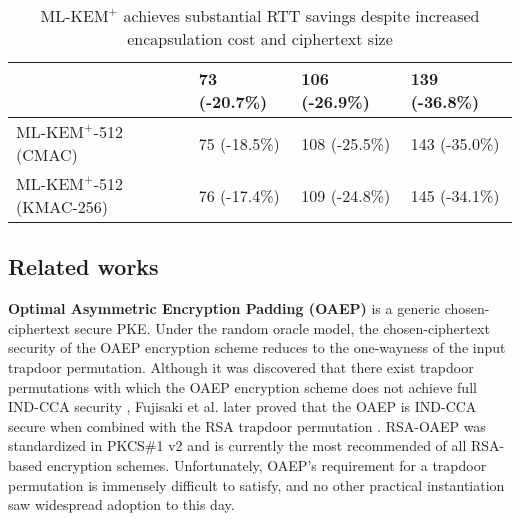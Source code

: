 \documentclass[journal=tches,submission]{iacrtrans}
\def\mlkemplus{\text{ML-KEM}^+}
\begin{document}
\begin{table}[h]
\begin{tabular}{|p{2.5cm}|p{1.4cm}|p{1.8cm}|p{1.8cm}|}
       & 73 \newline (-20.7\%)
       & 106 \newline (-26.9\%)
       & 139 \newline (-36.8\%) \\
       \hline
       $\mlkemplus$-512 \newline (CMAC)
       & 75 \newline (-18.5\%)
       & 108 \newline (-25.5\%)
       & 143 \newline (-35.0\%) \\
       \hline
       $\mlkemplus$-512 \newline (KMAC-256)
       & 76 \newline (-17.4\%)
       & 109 \newline (-24.8\%)
       & 145 \newline (-34.1\%) \\
       \hline
    \end{tabular}

    \caption{$\mlkemplus$ achieves substantial RTT savings despite increased encapsulation cost and ciphertext size}\label{tbl:rtt-summary}
\end{table}

\subsection{Related works}
\textbf{Optimal Asymmetric Encryption Padding (OAEP)} \cite{DBLP:conf/eurocrypt/BellareR94}\cite{DBLP:conf/crypto/BellareDPR98} is a generic chosen-ciphertext secure PKE. Under the random oracle model, the chosen-ciphertext security of the OAEP encryption scheme reduces to the one-wayness of the input trapdoor permutation. Although it was discovered that there exist trapdoor permutations with which the OAEP encryption scheme does not achieve full IND-CCA security \cite{DBLP:journals/joc/Shoup02}, Fujisaki et al. later proved that the OAEP is IND-CCA secure when combined with the RSA trapdoor permutation \cite{DBLP:conf/crypto/FujisakiOPS01}\cite{DBLP:journals/cacm/RivestSA78}. RSA-OAEP was standardized in PKCS\#1 v2 \cite{rfc8017} and is currently the most recommended of all RSA-based encryption schemes. Unfortunately, OAEP's requirement for a trapdoor permutation is immensely difficult to satisfy, and no other practical instantiation saw widespread adoption to this day.
\end{document}
